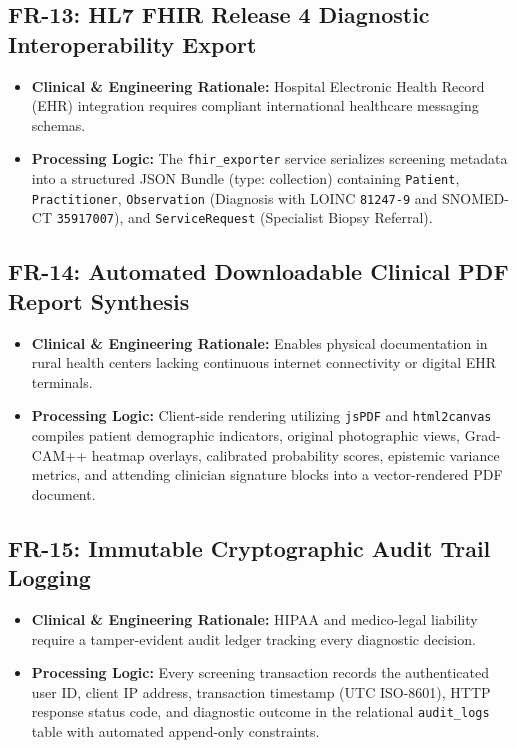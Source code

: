 \documentclass[12pt,a4paper,oneside]{report}
\begin{document}
\subsection{FR-13: HL7 FHIR Release 4 Diagnostic Interoperability Export}
\begin{itemize}
    \item \textbf{Clinical \& Engineering Rationale:} Hospital Electronic Health Record (EHR) integration requires compliant international healthcare messaging schemas.
    \item \textbf{Processing Logic:} The \texttt{fhir\_exporter} service serializes screening metadata into a structured JSON Bundle (type: collection) containing \texttt{Patient}, \texttt{Practitioner}, \texttt{Observation} (Diagnosis with LOINC \texttt{81247-9} and SNOMED-CT \texttt{35917007}), and \texttt{ServiceRequest} (Specialist Biopsy Referral).
\end{itemize}

\subsection{FR-14: Automated Downloadable Clinical PDF Report Synthesis}
\begin{itemize}
    \item \textbf{Clinical \& Engineering Rationale:} Enables physical documentation in rural health centers lacking continuous internet connectivity or digital EHR terminals.
    \item \textbf{Processing Logic:} Client-side rendering utilizing \texttt{jsPDF} and \texttt{html2canvas} compiles patient demographic indicators, original photographic views, Grad-CAM++ heatmap overlays, calibrated probability scores, epistemic variance metrics, and attending clinician signature blocks into a vector-rendered PDF document.
\end{itemize}

\subsection{FR-15: Immutable Cryptographic Audit Trail Logging}
\begin{itemize}
    \item \textbf{Clinical \& Engineering Rationale:} HIPAA and medico-legal liability require a tamper-evident audit ledger tracking every diagnostic decision.
    \item \textbf{Processing Logic:} Every screening transaction records the authenticated user ID, client IP address, transaction timestamp (UTC ISO-8601), HTTP response status code, and diagnostic outcome in the relational \texttt{audit\_logs} table with automated append-only constraints.
\end{itemize}
\end{document}
